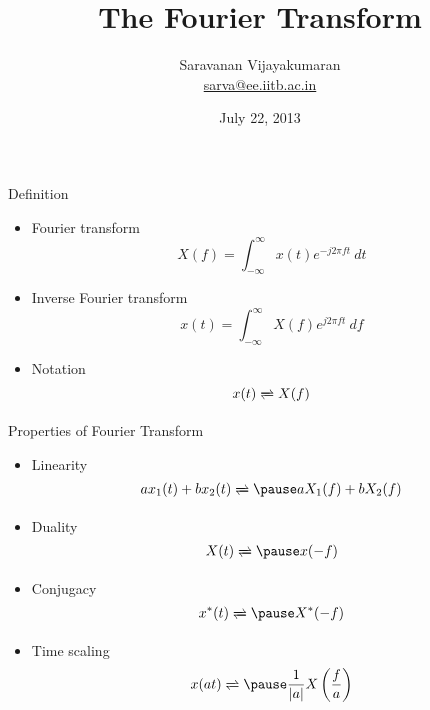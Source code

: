 \documentclass[t]{beamer}
\title[EE 703 DMT]{The Fourier Transform}
\author[Saravanan V]
{
  Saravanan Vijayakumaran\\
  \href{mailto:sarva@ee.iitb.ac.in}{sarva@ee.iitb.ac.in}
}
\institute[IIT Bombay]
{
  Department of Electrical Engineering\\
  Indian Institute of Technology Bombay
}
\date{July 22, 2013}
\begin{document}
\begin{frame}
  \titlepage
\end{frame}

\begin{frame}{Definition}
  \begin{itemize}
    \item \pause Fourier transform
      \begin{equation*}
        X(f) = \int_{-\infty}^{\infty} x(t) e^{-j2\pi ft} \ dt
      \end{equation*}
    \item \pause Inverse Fourier transform 
      \begin{equation*}
        x(t) = \int_{-\infty}^{\infty} X(f) e^{j2\pi ft} \ df
      \end{equation*}
    \item \pause Notation 
      \begin{equation*}
        x(t) \xrightleftharpoons{} X(f)
      \end{equation*}
  \end{itemize}
\end{frame}

\begin{frame}{Properties of Fourier Transform}
  \begin{itemize}
    \item Linearity
      \begin{equation*}
        a x_1(t) + b x_2(t) \xrightleftharpoons{} \pause a X_1(f) + b X_2(f) 
      \end{equation*}
    \pause
    \item Duality
      \begin{equation*}
        X(t) \xrightleftharpoons{} \pause x(-f) 
      \end{equation*}
    \pause
    \item Conjugacy
      \begin{equation*}
        x^{*}(t) \xrightleftharpoons{} \pause X^{*}(-f) 
      \end{equation*}
    \pause
    \item Time scaling
      \begin{equation*}
        x(at) \xrightleftharpoons{} \pause \frac{1}{|a|}X\left(\frac{f}{a}\right)
      \end{equation*}
  \end{itemize}
\end{frame}
\end{document}
